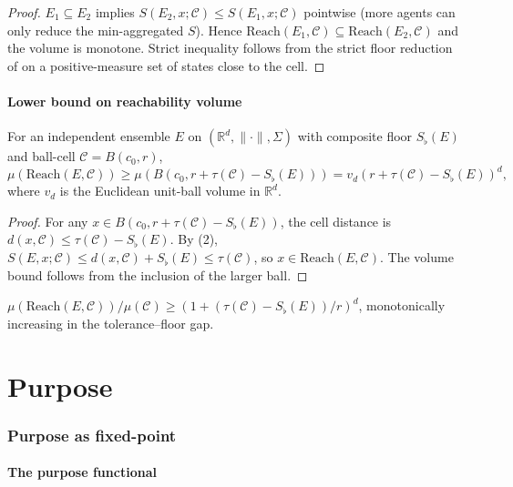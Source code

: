 \documentclass[11pt,a4paper]{article}
\newcommand{\R}{\mathbb{R}}
\newcommand{\Cell}{\mathcal{C}}
\newcommand{\Sfloor}{S_{\flat}}
\newcommand{\norm}[1]{\lVert#1\rVert}
\newcommand{\Reach}{\mathrm{Reach}}
\begin{document}
\begin{proof}
$E_1\subseteq E_2$ implies $S(E_2,x;\Cell)\le S(E_1,x;\Cell)$
pointwise (more agents can only reduce the min-aggregated $S$). Hence
$\Reach(E_1,\Cell)\subseteq\Reach(E_2,\Cell)$ and the volume is
monotone. Strict inequality follows from the strict floor reduction
of  on a positive-measure set of states close to
the cell.
\end{proof}

\subsection{Lower bound on reachability volume}

\begin{theorem}\label{thm:rlb}
For an independent ensemble $E$ on $(\R^d,\norm{\cdot},\Sigma)$ with
composite floor $\Sfloor(E)$ and ball-cell $\Cell=B(c_0,r)$,
\[
\mu(\Reach(E,\Cell))\ge\mu(B(c_0,r+\tau(\Cell)-\Sfloor(E)))
=v_d(r+\tau(\Cell)-\Sfloor(E))^d,
\]
where $v_d$ is the Euclidean unit-ball volume in $\R^d$.
\end{theorem}

\begin{proof}
For any $x\in B(c_0,r+\tau(\Cell)-\Sfloor(E))$, the cell distance is
$d(x,\Cell)\le\tau(\Cell)-\Sfloor(E)$. By (2),
$S(E,x;\Cell)\le d(x,\Cell)+\Sfloor(E)\le\tau(\Cell)$, so
$x\in\Reach(E,\Cell)$. The volume bound follows from the inclusion
of the larger ball.
\end{proof}

\begin{corollary}\label{cor:rratio}
$\mu(\Reach(E,\Cell))/\mu(\Cell)\ge
(1+(\tau(\Cell)-\Sfloor(E))/r)^d$, monotonically increasing in the
tolerance--floor gap.
\end{corollary}

\part{Purpose}

\section{Purpose as fixed-point}
\label{sec:purpose}

\subsection{The purpose functional}
\end{document}
